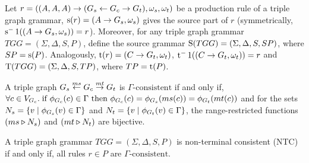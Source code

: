 \documentclass[]{report}
\begin{document}
\begin{definition}
	\label{def:source}
	Let $r = ((A,A,A) \pro (G_s \ms{} G_c \mt{} G_t), \omega_s, \omega_t)$ be a production rule of a triple graph grammar, $\source(r) = (A \pro G_s,\omega_s)$ gives the source part of $r$ (symmetrically, $\source^-1((A \pro G_s,\omega_s)) = r$). Moreover, for any triple graph grammar $TGG = (\Sigma, \Delta, S, P)$, define the source grammar $\Source(TGG) = (\Sigma, \Delta, S, SP)$, where $SP = \source(P)$. Analogously, $\target(r) = (C \pro G_t,\omega_t)$, $\target^-1((C \pro G_t,\omega_t)) = r$ and $\Target(TGG) = (\Sigma, \Delta, S, TP)$, where $TP = \target(P)$.
\end{definition}

\begin{definition}
	A triple graph $G_s \ms{ms} G_c \mt{mt} G_t$ is $\Gamma\text{-consistent}$ if and only if, 
$\forall c \in V_{G_c} \. \text{if } \phi_{G_c}(c) \in \Gamma \text{ then } \phi_{G_c}(c) = \phi_{G_s}(ms(c)) = \phi_{G_t}(mt(c))$ and for the sets $N_s = \{v \st \phi_{G_s}(v) \in \Gamma\}$ and $N_t = \{v \st \phi_{G_t}(v) \in \Gamma\}$, the range-restricted functions $(ms \rrestr N_s)$ and $(mt \rrestr N_t)$ are bijective.
\end{definition}

\begin{definition}
	A triple graph grammar $TGG = (\Sigma, \Delta, S, P)$ is non-terminal consistent (NTC) if and only if, all rules $r \in P$ are $\Gamma\text{-consistent}$.
\end{definition}
\end{document}
